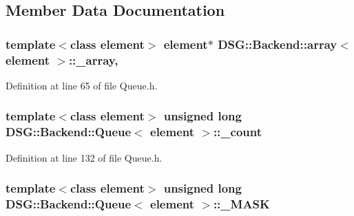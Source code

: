 \subsection{Member Data Documentation}
\hypertarget{classDSG_1_1Backend_1_1array_a520f838f921d4f48852694e79da0564c}{
\subsubsection[{\+\_\+array}]{\setlength{\rightskip}{0pt plus 5cm}template$<$class element$>$ element$\ast$ {\bf D\+S\+G\+::\+Backend\+::array}$<$ element $>$\+::\+\_\+array\hspace{0.3cm}{\ttfamily [protected]}, {\ttfamily [inherited]}}}\label{classDSG_1_1Backend_1_1array_a520f838f921d4f48852694e79da0564c}


Definition at line 65 of file Queue.\+h.

\hypertarget{classDSG_1_1Backend_1_1Queue_ae2ec3926f9e8cbabd17dadb309bcc26f}{
\subsubsection[{\+\_\+count}]{\setlength{\rightskip}{0pt plus 5cm}template$<$class element$>$ unsigned long {\bf D\+S\+G\+::\+Backend\+::\+Queue}$<$ element $>$\+::\+\_\+count\hspace{0.3cm}{\ttfamily [protected]}}}\label{classDSG_1_1Backend_1_1Queue_ae2ec3926f9e8cbabd17dadb309bcc26f}


Definition at line 132 of file Queue.\+h.

\hypertarget{classDSG_1_1Backend_1_1Queue_ad82aa028cc33db5cc22a4c478dabe399}{
\subsubsection[{\+\_\+\+M\+A\+S\+K}]{\setlength{\rightskip}{0pt plus 5cm}template$<$class element$>$ unsigned long {\bf D\+S\+G\+::\+Backend\+::\+Queue}$<$ element $>$\+::\+\_\+\+M\+A\+S\+K\hspace{0.3cm}{\ttfamily [protected]}}}\label{classDSG_1_1Backend_1_1Queue_ad82aa028cc33db5cc22a4c478dabe399}


